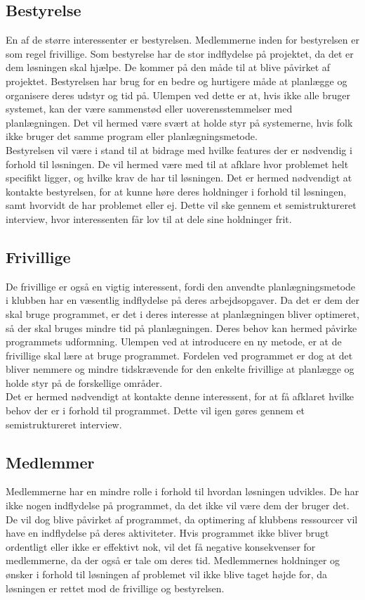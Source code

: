 \subsection{Bestyrelse}
En af de større interessenter er bestyrelsen. Medlemmerne inden for bestyrelsen er som regel frivillige. Som bestyrelse har de stor indflydelse på projektet, da det er dem løsningen skal hjælpe. De kommer på den måde til at blive påvirket af projektet. Bestyrelsen har brug for en bedre og hurtigere måde at planlægge og organisere deres udstyr og tid på. Ulempen ved dette er at, hvis ikke alle bruger systemet, kan der være sammenstød eller uoverensstemmelser med planlægningen. Det vil hermed være svært at holde styr på systemerne, hvis folk ikke bruger det samme program eller planlægningsmetode.\\ Bestyrelsen vil være i stand til at bidrage med hvilke features der er nødvendig i forhold til løsningen. De vil hermed være med til at afklare hvor problemet helt specifikt ligger, og hvilke krav de har til løsningen. Det er hermed nødvendigt at kontakte bestyrelsen, for at kunne høre deres holdninger i forhold til løsningen, samt hvorvidt de har problemet eller ej. Dette vil ske gennem et semistruktureret interview, hvor interessenten får lov til at dele sine holdninger frit.

\subsection{Frivillige}
De frivillige er også en vigtig interessent, fordi den anvendte planlægningsmetode i klubben har en væsentlig indflydelse på deres arbejdsopgaver. Da det er dem der skal bruge programmet, er det i deres interesse at planlægningen bliver optimeret, så der skal bruges mindre tid på planlægningen. Deres behov kan hermed påvirke programmets udformning. Ulempen ved at introducere en ny metode, er at de frivillige skal lære at bruge programmet. Fordelen ved programmet er dog at det bliver nemmere og mindre tidskrævende for den enkelte frivillige at planlægge og holde styr på de forskellige områder. \\ Det er hermed nødvendigt at kontakte denne interessent, for at få afklaret hvilke behov der er i forhold til programmet. Dette vil igen gøres gennem et semistruktureret interview.

\subsection{Medlemmer}
Medlemmerne har en mindre rolle i forhold til hvordan løsningen udvikles. De har ikke nogen indflydelse på programmet, da det ikke vil være dem der bruger det. De vil dog blive påvirket af programmet, da optimering af klubbens ressourcer vil have en indflydelse på deres aktiviteter. Hvis programmet ikke bliver brugt ordentligt eller ikke er effektivt nok, vil det få negative konsekvenser for medlemmerne, da der også er tale om deres tid. Medlemmernes holdninger og ønsker i forhold til løsningen af problemet vil ikke blive taget højde for, da løsningen er rettet mod de frivillige og bestyrelsen.

